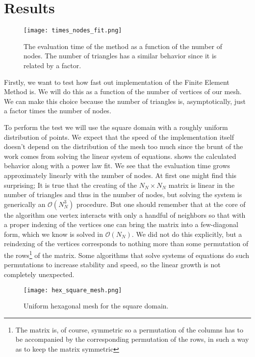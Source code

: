 \documentclass[10pt,a4paper,twocolumn]{article}
\begin{document}
\section{Results}

\begin{figure}[!t]
    \centering
    \texttt{[image: times\_nodes\_fit.png]}
    \caption{The evaluation time of the method as a function of the number of nodes. The number of triangles has a similar behavior since it is related by a factor.}
    \label{fig:times}
\end{figure}

Firstly, we want to test how fast out implementation of the Finite Element Method is. We will do this as a function of the number of vertices of our mesh. We can make this choice because the number of triangles is, asymptotically, just a factor times the number of nodes.

To perform the test we will use the square domain with a roughly uniform distribution of points. We expect that the speed of the implementation itself doesn't depend on the distribution of the mesh too much since the brunt of the work comes from solving the linear system of equations.  shows the calculated behavior along with a power law fit. We see that the evaluation time grows approximately linearly with the number of nodes. At first one might find this surprising; It is true that the creating of the $N_N \times N_N$ matrix is linear in the number of triangles and thus in the number of nodes, but solving the system is generically an $\mathcal{O}(N_N^3)$ procedure. But one should remember that at the core of the algorithm one vertex interacts with only a handful of neighbors so that with a proper indexing of the vertices one can bring the matrix into a few-diagonal form, which we know is solved in $\mathcal{O}(N_N)$. We did not do this explicitly, but a reindexing of the vertices corresponds to nothing more than some permutation of the rows\footnote{The matrix is, of course, symmetric so a permutation of the columns has to be accompanied by the corresponding permutation of the rows, in such a way as to keep the matrix symmetric} of the matrix. Some algorithms that solve systems of equations do such permutations to increase stability and speed, so the linear growth is not completely unexpected.

\begin{figure}[!t]
    \centering
    \texttt{[image: hex\_square\_mesh.png]}
    \caption{Uniform hexagonal mesh for the square domain.}
    \label{fig:hex}
\end{figure}
\end{document}

